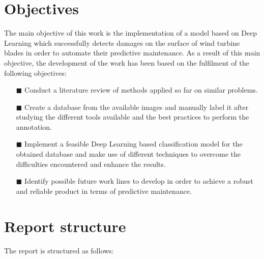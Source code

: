 \section{Objectives}
\label{sec:objectives}
The main objective of this work is the implementation of a model based on Deep Learning which successfully detects damages on the surface of wind turbine blades in order to automate their predictive maintenance. As a result of this main objective, the development of the work has been based on the fulfilment of the following objectives:

\begin{itemize}[]
    \item[\tiny$\blacksquare$]\textbf{}Conduct a literature review of methods applied so far on similar problems.
    \item[\tiny$\blacksquare$] \textbf{}Create a database from the available images and manually label it after studying the different tools available and the best practices to perform the annotation. 
    \item[\tiny$\blacksquare$] \textbf{}Implement a feasible Deep Learning based classification model for the obtained database and make use of different techniques to overcome the difficulties encountered and enhance the results.
    \item[\tiny$\blacksquare$] \textbf{}Identify possible future work lines to develop in order to achieve a robust and reliable product in terms of predictive maintenance.
\end{itemize}

\section{Report structure}
\label{sec:reportStructure}

The report is structured as follows:

